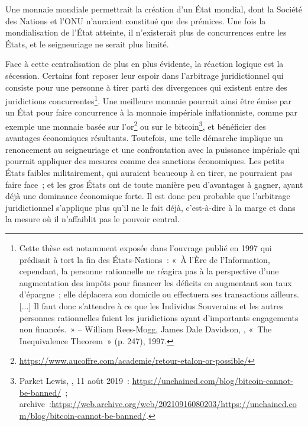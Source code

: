Une monnaie mondiale permettrait la création d'un État mondial, dont la Société des Nations et l'ONU n'auraient constitué que des prémices. Une fois la mondialisation de l'État atteinte, il n'existerait plus de concurrences entre les États, et le seigneuriage ne serait plus limité.

Face à cette centralisation de plus en plus évidente, la réaction logique est la sécession. Certains font reposer leur espoir dans l'arbitrage juridictionnel qui consiste pour une personne à tirer parti des divergences qui existent entre des juridictions concurrentes\footnote{Cette thèse est notamment exposée dans l'ouvrage  publié en 1997 qui prédisait à tort la fin des États-Nations~:  «~À l'Ère de l'Information, cependant, la personne rationnelle ne réagira pas à la perspective d'une augmentation des impôts pour financer les déficits en augmentant son taux d'épargne~; elle déplacera son domicile ou effectuera ses transactions ailleurs. [...] Il faut donc s'attendre à ce que les Individus Souverains et les autres personnes rationnelles fuient les juridictions ayant d'importants engagements non financés.~» -- William Rees-Mogg, James Dale Davidson, , «~The Inequivalence Theorem~» (p. 247), 1997.}. Une meilleure monnaie pourrait ainsi être émise par un État pour faire concurrence à la monnaie impériale inflationniste, comme par exemple une monnaie basée sur l'or\footnote{\url{https://www.aucoffre.com/academie/retour-etalon-or-possible/}} ou sur le bitcoin\footnote{Parket Lewis, , 11 août 2019~: \url{https://unchained.com/blog/bitcoin-cannot-be-banned/}~; archive~:\url{https://web.archive.org/web/20210916080203/https://unchained.com/blog/bitcoin-cannot-be-banned/}.}, et bénéficier des avantages économiques résultants. Toutefois, une telle démarche implique un renoncement au seigneuriage et une confrontation avec la puissance impériale qui pourrait appliquer des mesures comme des sanctions économiques. Les petits États faibles militairement, qui auraient beaucoup à en tirer, ne pourraient pas faire face~; et les gros États ont de toute manière peu d'avantages à gagner, ayant déjà une dominance économique forte. Il est donc peu probable que l'arbitrage juridictionnel s'applique plus qu'il ne le fait déjà, c'est-à-dire à la marge et dans la mesure où il n'affaiblit pas le pouvoir central. %

